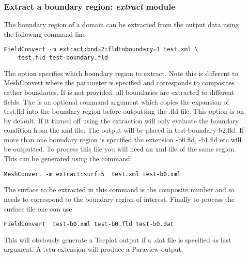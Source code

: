 \subsubsection{Extract a boundary region: \textit{extract} module}
The boundary region of a domain can be extracted from the output 
data using the following command line
%
\begin{lstlisting}[style=BashInputStyle]
FieldConvert -m extract:bnd=2:fldtoboundary=1 test.xml \
	test.fld test-boundary.fld
\end{lstlisting}
%
The option  specifies which boundary region to extract. 
Note this is different to MeshConvert where the parameter  
is specified and corresponds to composites rather boundaries. If  
is not provided, all boundaries are extracted to different fields. The  
is an optional command argument which copies the expansion of test.fld into 
the boundary region before outputting the .fld file. This option is on by default. 
If it turned off using \inltt{fldtoboundary=0} the extraction will only evaluate the 
boundary condition from the xml file. The output will be placed in test-boundary-b2.fld. 
If more than one boundary region is specified the extension -b0.fld, -b1.fld etc will be 
outputted. To process this file you will need an xml file of the same region. 
This can be generated using the command:
%
\begin{lstlisting}[style=BashInputStyle]
MeshConvert -m extract:surf=5  test.xml test-b0.xml
\end{lstlisting}
%
The surface to be extracted in this command is the composite 
number and so needs to correspond to the boundary region 
of interest. Finally to process the surface file one can use
%
\begin{lstlisting}[style=BashInputStyle]
FieldConvert  test-b0.xml test-b0.fld test-b0.dat
\end{lstlisting}
%
This will obviously generate a Tecplot output if a .dat file 
is specified as last argument. A .vtu extension will produce 
a Paraview output.
%
%
%
